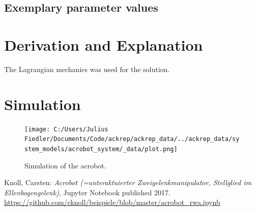 \documentclass[10pt,a4paper]{article}
\begin{document}
	
	\subsection{Exemplary parameter values}
	

	
	\section{Derivation and Explanation} %
	The Lagrangian mechanics was used for the solution.
	
	
	

\section{Simulation}
\begin{figure}[H]
\centering
\texttt{[image: C:/Users/Julius Fiedler/Documents/Code/ackrep/ackrep\_data/../ackrep\_data/system\_models/acrobot\_system/\_data/plot.png]}
\caption{Simulation of the acrobot.}
\end{figure}
	\begin{thebibliography}{10}		
		Knoll, Carsten: 
		\textit{Acrobot (=unteraktuierter Zweigelenkmanipulator, Stellglied im Ellenbogengelenk)}, Jupyter Notebook published 2017. \\
		\url{https://github.com/cknoll/beispiele/blob/master/acrobot_rwa.ipynb}
	\end{thebibliography}
\end{document}

